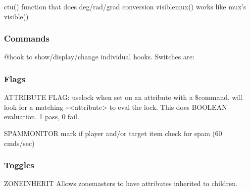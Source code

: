 \documentclass[letterpaper,10pt,english]{sphinxmanual}
\begin{document}
\sphinxAtStartPar
ctu() \sphinxhyphen{} function that does deg/rad/grad conversion
visiblemux() \sphinxhyphen{} works like mux’s visible()


\subsubsection{Commands}
\label{\detokenize{changelog:id21}}
\sphinxAtStartPar
@hook to show/display/change individual hooks.  Switches are:

\begin{sphinxVerbatim}[commandchars=\\\{\}]
                    
                      
                  
                   
                  

    
\end{sphinxVerbatim}


\subsubsection{Flags}
\label{\detokenize{changelog:id22}}
\sphinxAtStartPar
ATTRIBUTE FLAG: uselock \sphinxhyphen{} when set on an attribute with a \$command, will look for a matching \textasciitilde{}\textless{}attribute\textgreater{} to eval the lock.  This does BOOLEAN evaluation.  1 pass, 0 fail.

\sphinxAtStartPar
SPAMMONITOR \sphinxhyphen{} mark if player and/or target item check for spam (60 cmds/sec)


\subsubsection{Toggles}
\label{\detokenize{changelog:id23}}
\sphinxAtStartPar
ZONEINHERIT \sphinxhyphen{} Allows zonemasters to have attributes inherited to children.
\end{document}
